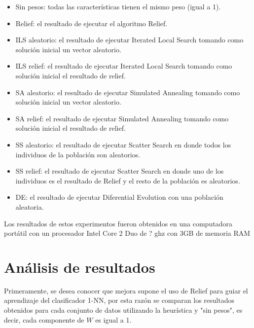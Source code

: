 \documentclass{ci5652}
\begin{document}
\begin{itemize}
  \item Sin pesos: todas las características tienen el mismo peso (igual a 1).
  \item Relief: el resultado de ejecutar el algoritmo Relief.
  \item ILS aleatorio: el resultado de ejecutar Iterated Local Search tomando
  como solución inicial un vector aleatorio.
  \item ILS relief: el resultado de ejecutar Iterated Local Search tomando como
  solución inicial el resultado de relief.
  \item SA aleatorio: el resultado de ejecutar Simulated Annealing tomando como
  solución inicial un vector aleatorio.
  \item SA relief: el resultado de ejecutar Simulated Annealing tomando como
  solución inicial el resultado de relief.
  \item SS aleatorio: el resultado de ejecutar Scatter Search en donde todos los
  individuos de la población son aleatorios.
  \item SS relief: el resultado de ejecutar Scatter Search en donde uno de los
  individuos es el resultado de Relief y el resto de la población es aleatorios.
  \item DE: el resultado de ejecutar Diferential Evolution con una población
  aleatoria.
\end{itemize}

Los resultados de estos experimentos fueron obtenidos en una computadora portátil con un procesador Intel Core 2 Duo de ? ghz con 3GB de memoria RAM


\section{Análisis de resultados}

Primeramente, se desea conocer que mejora supone el uso de Relief para guiar el aprendizaje del clasificador 1-NN, por esta razón se comparan los resultados obtenidos para cada conjunto de datos utilizando la heurística y "sin pesos", es decir, cada componente de $W$ es igual a 1.\\
\end{document}
